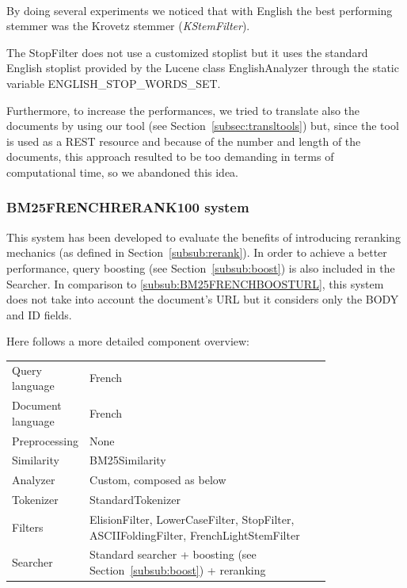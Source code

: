 \\
By doing several experiments we noticed that with English the best performing stemmer was the Krovetz stemmer (\textit{KStemFilter}).
\par
The StopFilter does not use a customized stoplist but it uses the standard English stoplist provided by the Lucene class EnglishAnalyzer through the static variable ENGLISH\_STOP\_WORDS\_SET.
\par
Furthermore, to increase the performances, we tried to translate also the documents by using our tool (see Section~\ref{subsec:transltools}) but, since the tool is used as a REST resource and because of the number and length of the documents, this approach resulted to be too demanding in terms of computational time, so we abandoned this idea.

\subsubsection{BM25FRENCHRERANK100 system}
\label{subsub:BM25FRENCHRERANK100}
This system has been developed to evaluate the benefits of introducing reranking mechanics (as defined in Section~\ref{subsub:rerank}).
In order to achieve a better performance, query boosting (see Section~\ref{subsub:boost}) is also included in the Searcher. In comparison to  \ref{subsub:BM25FRENCHBOOSTURL}, this system does not take into account the document's URL but it considers only the BODY and ID fields.
\par Here follows a more detailed component overview:
\begin{table}[h!]
    \centering
    \begin{tabular}{l p{0.8\linewidth}}
    Query language & French\\
    Document language & French\\
    Preprocessing & None\\
    Similarity & BM25Similarity\\
    Analyzer & Custom, composed as below\\
    Tokenizer & StandardTokenizer\\
    Filters & ElisionFilter, LowerCaseFilter, StopFilter, ASCIIFoldingFilter, FrenchLightStemFilter\\
    Searcher & Standard searcher + boosting (see Section~\ref{subsub:boost}) + reranking
    \end{tabular}
\end{table}
